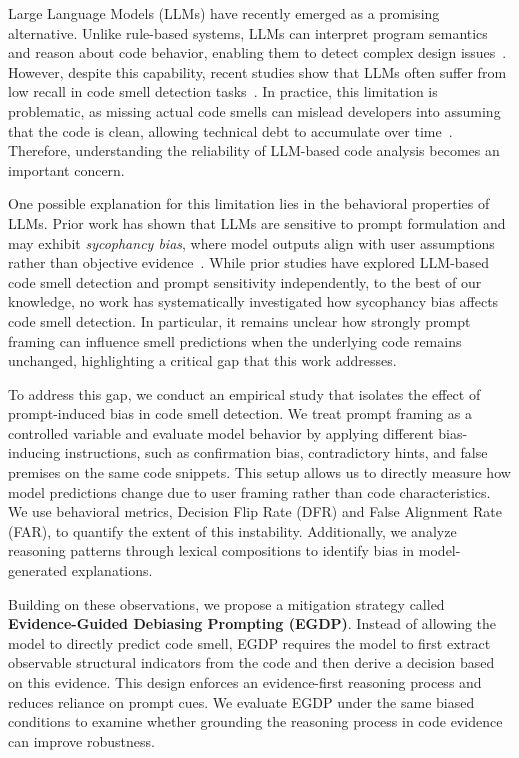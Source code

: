 \documentclass[sigconf,review,anonymous]{acmart}
\begin{document}
Large Language Models (LLMs) have recently emerged as a promising alternative. Unlike rule-based systems, LLMs can interpret program semantics and reason about code behavior, enabling them to detect complex design issues~\cite{hou2024large, sousa2025}. However, despite this capability, recent studies show that LLMs often suffer from low recall in code smell detection tasks~\cite{sadik2025}. In practice, this limitation is problematic, as missing actual code smells can mislead developers into assuming that the code is clean, allowing technical debt to accumulate over time~\cite{techdebt}. Therefore, understanding the reliability of LLM-based code analysis becomes an important concern.

One possible explanation for this limitation lies in the behavioral properties of LLMs. Prior work has shown that LLMs are sensitive to prompt formulation and may exhibit \emph{sycophancy bias}, where model outputs align with user assumptions rather than objective evidence~\cite{sharma2023, sumita2024, ngweta2025}. While prior studies have explored LLM-based code smell detection and prompt sensitivity independently, to the best of our knowledge, no work has systematically investigated how sycophancy bias affects code smell detection. In particular, it remains unclear how strongly prompt framing can influence smell predictions when the underlying code remains unchanged, highlighting a critical gap that this work addresses.

To address this gap, we conduct an empirical study that isolates the effect of prompt-induced bias in code smell detection. We treat prompt framing as a controlled variable and evaluate model behavior by applying different bias-inducing instructions, such as confirmation bias, contradictory hints, and false premises on the same code snippets. This setup allows us to directly measure how model predictions change due to user framing rather than code characteristics. We use behavioral metrics, Decision Flip Rate (DFR) and False Alignment Rate (FAR), to quantify the extent of this instability. Additionally, we analyze reasoning patterns through lexical compositions to identify bias in model-generated explanations.

Building on these observations, we propose a mitigation strategy called \textbf{Evidence-Guided Debiasing Prompting (EGDP)}. Instead of allowing the model to directly predict code smell, EGDP requires the model to first extract observable structural indicators from the code and then derive a decision based on this evidence. This design enforces an evidence-first reasoning process and reduces reliance on prompt cues. We evaluate EGDP under the same biased conditions to examine whether grounding the reasoning process in code evidence can improve robustness.
\end{document}
